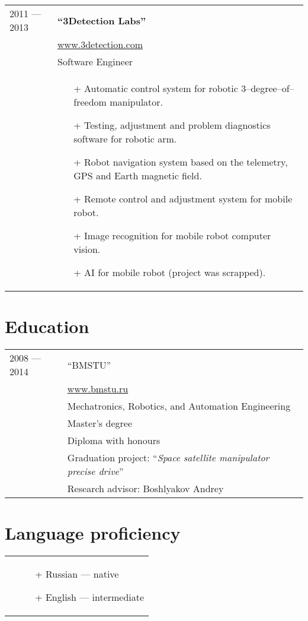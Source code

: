\documentclass[a4paper, 10pt]{article}
\begin{document}
\begin{longtable}{p{20mm}|p{140mm}}
2011 --- 2013 & \textbf{``3Detection Labs''} \\
& \href{http://www.3detection.com/}{www.3detection.com} \\
& Software Engineer \\
& \begin{itemize}[topsep = 0pt, itemsep = 0pt]
    \item[+] Automatic control system for robotic 3--degree--of--freedom manipulator.
    \item[+] Testing, adjustment and problem diagnostics software for robotic arm.
    \item[+] Robot navigation system based on the telemetry, GPS and Earth magnetic field.
    \item[+] Remote control and adjustment system for mobile robot.
    \item[+] Image recognition for mobile robot computer vision.
    \item[+] AI for mobile robot (project was scrapped).
\end{itemize}
\\
\end{longtable}

\section{Education}
\begin{longtable}{p{20mm}|p{140mm}}
2008 --- 2014
& ``BMSTU'' \\
& \href{http://www.bmstu.ru}{www.bmstu.ru} \\
& Mechatronics, Robotics, and Automation Engineering \\
& Master's degree \\
& Diploma with honours \\
& Graduation project: ``\textit{Space satellite manipulator precise drive}'' \\
& Research advisor: Boshlyakov Andrey \\
\end{longtable}

\section{Language proficiency}
\begin{longtable}{p{20mm}|p{140mm}}
& \begin{itemize}[topsep = 0pt, itemsep = 0pt]
    \item[+] Russian --- native
    \item[+] English --- intermediate
\end{itemize} \\
\end{longtable}
\end{document}
